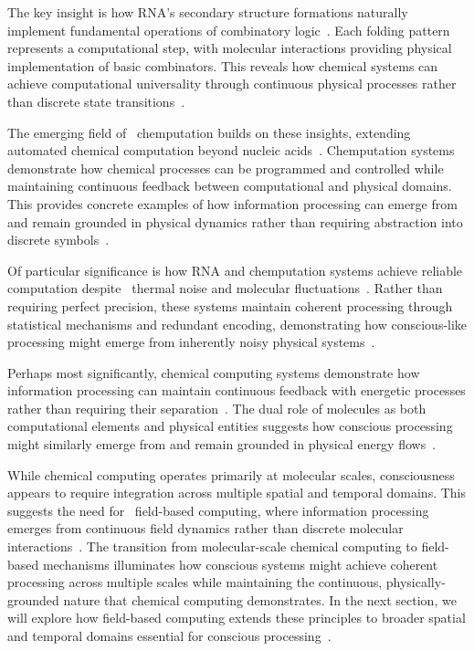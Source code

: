 The key insight is how RNA's secondary structure formations naturally implement fundamental operations of combinatory logic~\cite{Qian2011}. Each folding pattern represents a computational step, with molecular interactions providing physical implementation of basic combinators. This reveals how chemical systems can achieve computational universality through continuous physical processes rather than discrete state transitions~\cite{Soloveichik2010}.

The emerging field of~ chemputation builds on these insights, extending automated chemical computation beyond nucleic acids~\cite{Szacilowski2012,Gidon2020}. Chemputation systems demonstrate how chemical processes can be programmed and controlled while maintaining continuous feedback between computational and physical domains. This provides concrete examples of how information processing can emerge from and remain grounded in physical dynamics rather than requiring abstraction into discrete symbols~\cite{Wang2021,Larkum2022}.

Of particular significance is how RNA and chemputation systems achieve reliable computation despite~ thermal noise and molecular fluctuations~\cite{Benenson2019,Polsky2004}. Rather than requiring perfect precision, these systems maintain coherent processing through statistical mechanisms and redundant encoding, demonstrating how conscious-like processing might emerge from inherently noisy physical systems~\cite{Katz2012}.

Perhaps most significantly, chemical computing systems demonstrate how information processing can maintain continuous feedback with energetic processes rather than requiring their separation~\cite{Lehn2013,hunt2023fields}. The dual role of molecules as both computational elements and physical entities suggests how conscious processing might similarly emerge from and remain grounded in physical energy flows~\cite{Magnasco1997}.

While chemical computing operates primarily at molecular scales, consciousness appears to require integration across multiple spatial and temporal domains. This suggests the need for~ field-based computing, where information processing emerges from continuous field dynamics rather than discrete molecular interactions~\cite{Prakash2007,hunt2024electromagnetic}. The transition from molecular-scale chemical computing to field-based mechanisms illuminates how conscious systems might achieve coherent processing across multiple scales while maintaining the continuous, physically-grounded nature that chemical computing demonstrates. In the next section, we will explore how field-based computing extends these principles to broader spatial and temporal domains essential for conscious processing~\cite{pinotsis2023vivo,bosl2025dynamical}.
